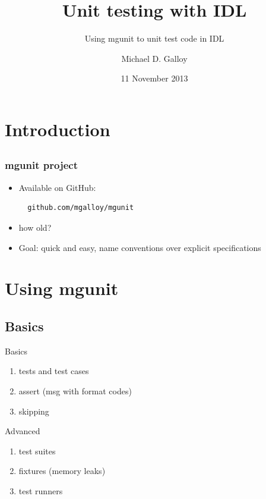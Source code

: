 \documentclass[12pt, handout]{beamer}
\title{Unit testing with IDL}
\subtitle{Using mgunit to unit test code in IDL}
\author{Michael D. Galloy}
\institute[Tech-X Corporation]{Tech-X Corporation\\ Boulder, CO}
\date{11 November 2013}
\begin{document}
\begin{frame}[plain]
  \titlepage
\end{frame}


\section{Introduction}
\subsection*{}

\begin{frame}
  \tableofcontents
\end{frame}

\begin{frame}[t, fragile]
  \frametitle{mgunit project}
  \begin{itemize}
    \item Available on GitHub:

\begin{lstlisting}
  github.com/mgalloy/mgunit
\end{lstlisting}

    \item how old?
    \item Goal: quick and easy, name conventions over explicit specifications
  \end{itemize}
\end{frame}


\section{Using mgunit}
\subsection{Basics}

\begin{frame}[t]{Basics}
  \begin{enumerate}
    \item tests and test cases
    \item assert (msg with format codes)
    \item skipping
  \end{enumerate}
\end{frame}

\begin{frame}[t]{Advanced}
  \begin{enumerate}
    \item test suites
    \item fixtures (memory leaks)
    \item test runners
  \end{enumerate}
\end{frame}
\end{document}
